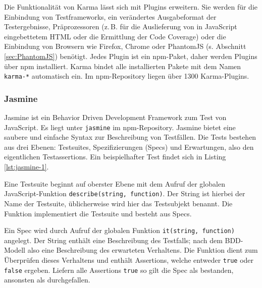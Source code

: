 \begin{figure}[H]
	
\end{figure}

Die Funktionalität von Karma lässt sich mit Plugins erweitern. Sie werden für die Einbindung von Testframeworks, ein verändertes Ausgabeformat der Testergebnisse, Präprozessoren (z.\,B. für die Auslieferung von in JavaScript eingebettetem HTML oder die Ermittlung der Code Coverage)\cite{karma-preprocessors} oder die Einbindung von Browsern wie Firefox, Chrome oder PhantomJS (s. Abschnitt \ref{sec:PhantomJS}) benötigt. Jedes Plugin ist ein npm-Paket, daher werden Plugins über npm installiert. Karma bindet alle installierten Pakete mit dem Namen \texttt{karma-*} automatisch ein.\cite{karma-plugins} Im npm-Repository liegen über 1300 Karma-Plugins.\cite{karma-npm}

\subsubsection{Jasmine}
\label{sec:Jasmine}
Jasmine ist ein Behavior Driven Development Framework zum Test von JavaScript\cite{jasmine-introduction}. Es liegt unter \texttt{jasmine} im npm-Repository\cite{jasmine-getting-started}. Jasmine bietet eine saubere und einfache Syntax zur Beschreibung von Testfällen. Die Tests bestehen aus drei Ebenen: Testsuites, Spezifizierungen (\glqq Specs\grqq) und Erwartungen, also den eigentlichen Testassertions\cite{jasmine-introduction}. Ein beispielhafter Test findet sich in Listing \ref{lst:jasmine-1}.

Eine Testsuite beginnt auf oberster Ebene mit dem Aufruf der globalen JavaScript-Funktion \texttt{describe(string, function)}. Der String ist hierbei der Name der Testsuite, üblicherweise wird hier das Testsubjekt benannt. Die Funktion implementiert die Testsuite und besteht aus Specs.\cite{jasmine-introduction}

Ein Spec wird durch Aufruf der globalen Funktion \texttt{it(string, function)} angelegt. Der String enthält eine Beschreibung des Testfalls; nach dem BDD-Modell also eine Beschreibung des erwarteten Verhaltens. Die Funktion dient zum Überprüfen dieses Verhaltens und enthält Assertions, welche entweder \texttt{true} oder \texttt{false} ergeben. Liefern alle Assertions \texttt{true} so gilt die Spec als bestanden, ansonsten als durchgefallen.\cite{jasmine-introduction}


